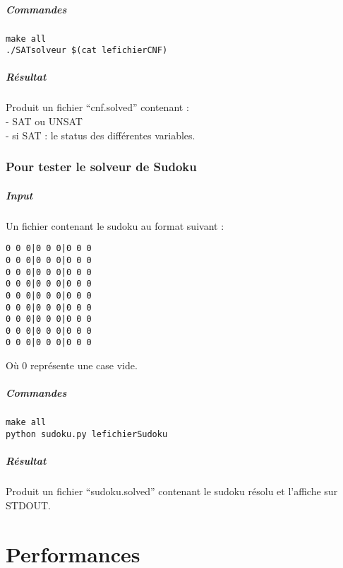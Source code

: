 \documentclass{report}
\begin{document}
\paragraph{Commandes}
\begin{verbatim}
make all
./SATsolveur $(cat lefichierCNF)
\end{verbatim}

\paragraph{Résultat}
Produit un fichier ``cnf.solved'' contenant : \\
- SAT ou UNSAT \\
- si SAT : le status des différentes variables.

\subsection{Pour tester le solveur de Sudoku}

\paragraph{Input}
Un fichier contenant le sudoku au format suivant :
\begin{verbatim}
0 0 0|0 0 0|0 0 0
0 0 0|0 0 0|0 0 0
0 0 0|0 0 0|0 0 0
0 0 0|0 0 0|0 0 0
0 0 0|0 0 0|0 0 0
0 0 0|0 0 0|0 0 0
0 0 0|0 0 0|0 0 0
0 0 0|0 0 0|0 0 0
0 0 0|0 0 0|0 0 0
\end{verbatim}
Où 0 représente une case vide.

\paragraph{Commandes}
\begin{verbatim}
make all
python sudoku.py lefichierSudoku
\end{verbatim}

\paragraph{Résultat}
Produit un fichier ``sudoku.solved'' contenant le sudoku résolu et l'affiche sur STDOUT.


\chapter{Performances}
\end{document}
